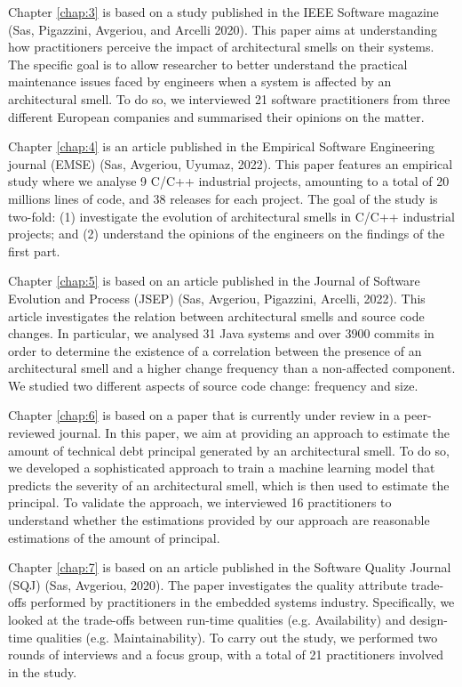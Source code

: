 Chapter \ref{chap:3} is based on a study published in the IEEE Software magazine (Sas, Pigazzini, Avgeriou, and Arcelli 2020).
This paper aims at understanding how practitioners perceive the impact of architectural smells on their systems.
The specific goal is to allow researcher to better understand the practical maintenance issues faced by engineers when a system is affected by an architectural smell.
To do so, we interviewed 21 software practitioners from three different European companies and summarised their opinions on the matter.

Chapter \ref{chap:4} is an article published in the Empirical Software Engineering journal (EMSE) (Sas, Avgeriou, Uyumaz, 2022).
This paper features an empirical study where we analyse 9 C/C++ industrial projects, amounting to a total of 20 millions lines of code, and 38 releases for each project.
The goal of the study is two-fold: (1) investigate the evolution of architectural smells in C/C++ industrial projects; and (2) understand the opinions of the engineers on the findings of the first part.

Chapter \ref{chap:5} is based on an article published in the Journal of Software Evolution and Process (JSEP) (Sas, Avgeriou, Pigazzini, Arcelli, 2022).
This article investigates the relation between architectural smells and source code changes.
In particular, we analysed 31 Java systems and over 3900 commits in order to determine the existence of a correlation between the presence of an architectural smell and a higher change frequency than a non-affected component. 
We studied two different aspects of source code change: frequency and size.

Chapter \ref{chap:6} is based on a paper that is currently under review in a peer-reviewed journal.
In this paper, we aim at providing an approach to estimate the amount of technical debt principal generated by an architectural smell.
To do so, we developed a sophisticated approach to train a machine learning model that predicts the severity of an architectural smell, which is then used to estimate the principal.
To validate the approach, we interviewed 16 practitioners to understand whether the estimations provided by our approach are reasonable estimations of the amount of principal.

Chapter \ref{chap:7} is based on an article published in the Software Quality Journal (SQJ) (Sas, Avgeriou, 2020).
The paper investigates the quality attribute trade-offs performed by practitioners in the embedded systems industry.
Specifically, we looked at the trade-offs between run-time qualities (e.g. Availability) and design-time qualities (e.g. Maintainability).
To carry out the study, we performed two rounds of interviews and a focus group, with a total of 21 practitioners involved in the study.
